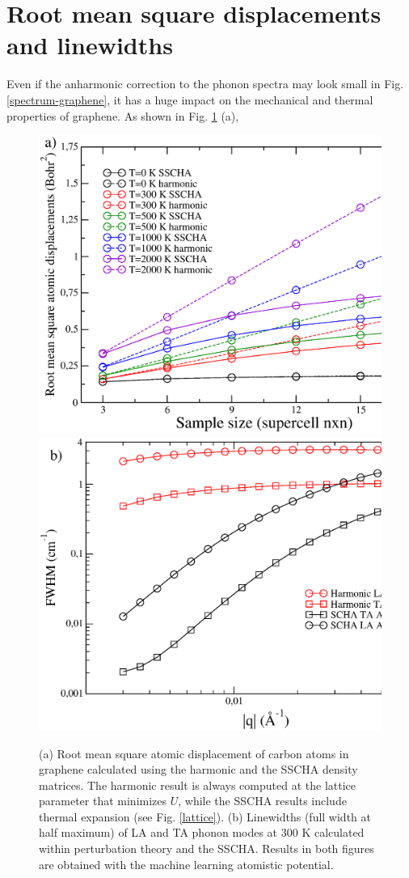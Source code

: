 \section{Root mean square displacements and linewidths}

Even if the anharmonic correction to the phonon spectra may look small in Fig. \ref{spectrum-graphene}, it has a 
huge impact on the mechanical and thermal properties of graphene. As shown in Fig. \ref{problems} (a), 
\begin{figure}[ht]
\includegraphics[width=0.8\linewidth]{Figures/rms.eps}
\includegraphics[width=0.8\linewidth]{Figures/lw-graphene.eps}
\caption[SSCHA root mean square atomic displacements and linewidths]{(a) Root mean square atomic displacement of 
	carbon atoms in graphene calculated using the harmonic and the SSCHA density matrices. The harmonic result 
	is always computed at the lattice parameter that minimizes $U$, while the SSCHA results include thermal 
	expansion (see Fig. \ref{lattice}). (b) Linewidths (full width at half maximum) of LA and TA phonon modes 
	at $300$ K calculated within perturbation theory and the SSCHA. Results in both figures are obtained with 
	the machine learning atomistic potential.}
\label{problems}
\end{figure}
